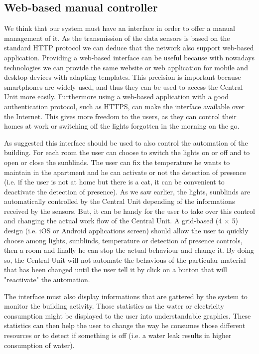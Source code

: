 \documentclass{acm_proc_article-sp}
\begin{document}
\subsection{Web-based manual controller}
We think that our system must have an interface in order to offer a manual management of it.
As the transmission of the data sensors is based on the standard HTTP protocol we can deduce that the network also support web-based application.
Providing a web-based interface can be useful because with nowadays technologies we can provide the same website or web application for mobile and desktop devices with adapting templates.
This precision is important because smartphones are widely used, and thus they can be used to access the Central Unit more easily. 
Furthermore using a web-based application with a good authentication protocol, such as HTTPS, can make the interface available over the Internet.
This gives more freedom to the users, as they can control their homes at work or switching off the lights forgotten in the morning on the go.

As suggested this interface should be used to also control the automation of the building.
For each room the user can choose to switch the lights on or off and to open or close the sunblinds.
The user can fix the temperature he wants to maintain in the apartment and he can activate or not the detection of presence (i.e. if the user is not at home but there is a cat, it can be convenient to deactivate the detection of presence).
As we saw earlier, the lights, sunblinds are automatically controlled by the Central Unit depending of the informations received by the sensors. But, it can be handy for the user to take over this control and changing the actual work flow of the Central Unit.
A grid-based (4 $\times$ 5) design (i.e. iOS or Android applications screen) should allow the user to quickly choose among lights, sunblinds, temperature or detection of presence controls, then a room and finally he can stop the actual behaviour and change it. By doing so, the Central Unit will not automate the behavious of the particular material that has been changed until the user tell it by click on a button that will "reactivate" the automation.

The interface must also display informations that are gattered by the system to monitor the building activity.
Those statistics as the water or electricity consumption might be displayed to the user into understandable graphics.
These statistics can then help the user to change the way he consumes those different resources or to detect if something is off (i.e. a water leak results in higher consumption of water).
\end{document}
